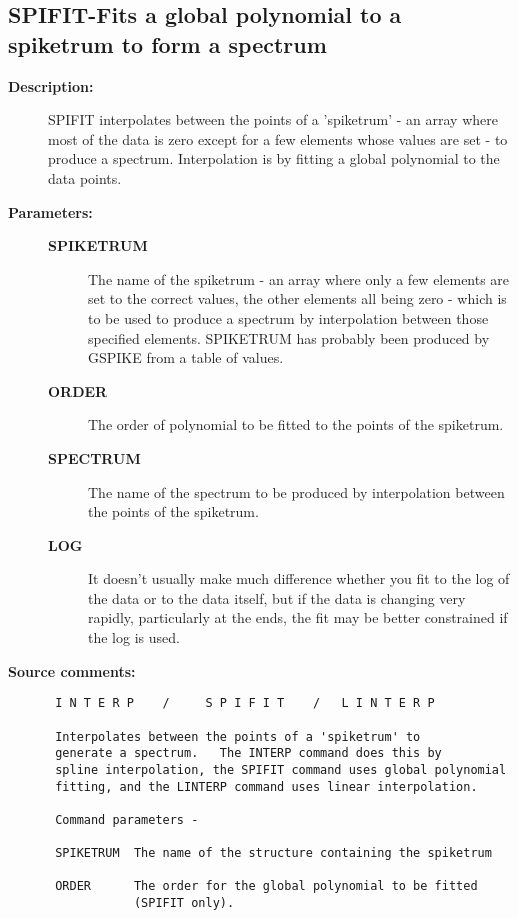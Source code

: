 \subsection{SPIFIT-\label{SPIFIT}Fits a global polynomial to a spiketrum to form a spectrum}
\begin{description}

\item [{\bf Description:}]
 SPIFIT interpolates between the points of a 'spiketrum' - an
 array where most of the data is zero except for a few elements
 whose values are set - to produce a spectrum.  Interpolation is
 by fitting a global polynomial to the data points.

\item [{\bf Parameters:}]
\begin{description}
\item [{\bf SPIKETRUM}]
 The name of the spiketrum - an array where
 only a few elements are set to the correct values, the
 other elements all being zero - which is to be used to
 produce a spectrum by interpolation between those specified
 elements.  SPIKETRUM has probably been produced by GSPIKE
 from a table of values.
\item [{\bf ORDER}]
 The order of polynomial to be fitted to the
 points of the spiketrum.
\item [{\bf SPECTRUM}]
 The name of the spectrum to be produced by
 interpolation between the points of the spiketrum.
\item [{\bf LOG}]
 It doesn't usually make much difference whether you fit
 to the log of the data or to the data itself, but if the
 data is changing very rapidly, particularly at the ends,
 the fit may be better constrained if the log is used.
\end{description}

\item [{\bf Source comments:}]
\begin{verbatim}
 I N T E R P    /     S P I F I T    /   L I N T E R P

 Interpolates between the points of a 'spiketrum' to
 generate a spectrum.   The INTERP command does this by
 spline interpolation, the SPIFIT command uses global polynomial
 fitting, and the LINTERP command uses linear interpolation.

 Command parameters -

 SPIKETRUM  The name of the structure containing the spiketrum

 ORDER      The order for the global polynomial to be fitted
            (SPIFIT only).


\end{verbatim}
\end{description}
